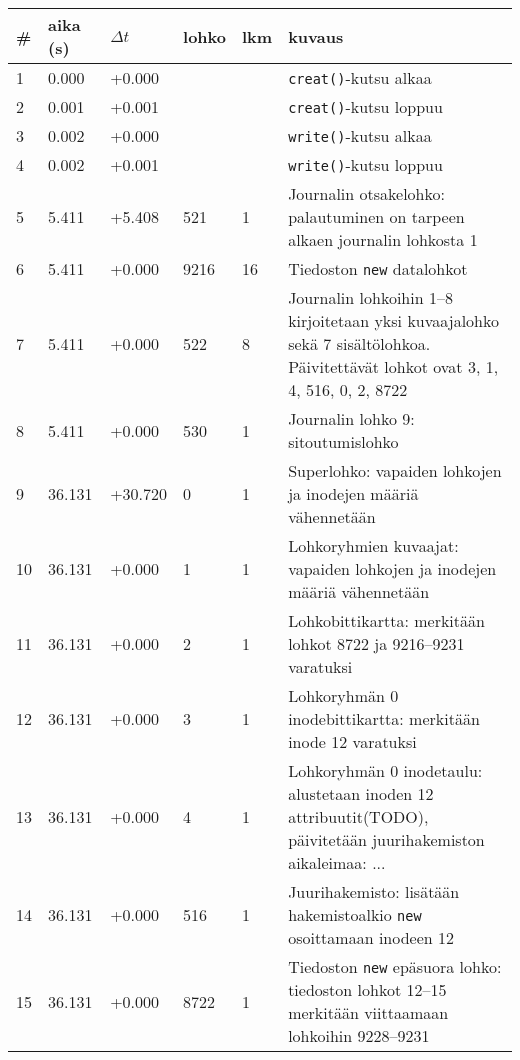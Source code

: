 \begin{table}[H]
\begin{tabular}{l | l | l | l | l | p{7cm}}
    \# & aika (s) & $\Delta t$ & lohko & lkm & kuvaus \\ \hline \hline
    1  & 0.000    & +0.000   &      &      & \texttt{creat()}-kutsu alkaa   \\ \hline %
    2  & 0.001    & +0.001   &      &      & \texttt{creat()}-kutsu loppuu  \\ \hline %
    3  & 0.002    & +0.000   &      &      & \texttt{write()}-kutsu alkaa   \\ \hline %
    4  & 0.002    & +0.001   &      &      & \texttt{write()}-kutsu loppuu  \\ \hline %
    5  & 5.411    & +5.408   & 521  & 1    & Journalin otsakelohko: palautuminen on tarpeen alkaen journalin lohkosta 1                       \\ \hline %
    6  & 5.411    & +0.000   & 9216 & 16   & Tiedoston \texttt{new} datalohkot                               \\ \hline %
    7  & 5.411    & +0.000   & 522  & 8    & Journalin lohkoihin 1--8 kirjoitetaan yksi kuvaajalohko sekä 7 sisältölohkoa. Päivitettävät lohkot ovat 3, 1, 4, 516, 0, 2, 8722                       \\ \hline %
    8  & 5.411    & +0.000   & 530  & 1    & Journalin lohko 9: sitoutumislohko                       \\ \hline %
    9  & 36.131   & +30.720  & 0    & 1    & Superlohko: vapaiden lohkojen ja inodejen määriä vähennetään                     \\ \hline %
    10 & 36.131   & +0.000   & 1    & 1    & Lohkoryhmien kuvaajat: vapaiden lohkojen ja inodejen määriä vähennetään                     \\ \hline %
    11 & 36.131   & +0.000   & 2    & 1    & Lohkobittikartta: merkitään lohkot 8722 ja 9216--9231 varatuksi                     \\ \hline %
    12 & 36.131   & +0.000   & 3    & 1    & Lohkoryhmän 0 inodebittikartta: merkitään inode 12 varatuksi \\ \hline %
    13 & 36.131   & +0.000   & 4    & 1    & Lohkoryhmän 0 inodetaulu: alustetaan inoden 12 attribuutit(TODO), päivitetään juurihakemiston aikaleimaa: ...                     \\ \hline %
    14 & 36.131   & +0.000   & 516  & 1    & Juurihakemisto: lisätään hakemistoalkio \texttt{new} osoittamaan inodeen 12                 \\ \hline %
    15 & 36.131   & +0.000   & 8722 & 1    & Tiedoston \texttt{new} epäsuora lohko: tiedoston lohkot 12--15 merkitään viittaamaan lohkoihin 9228--9231 \\        %
\end{tabular}
\end{table}

